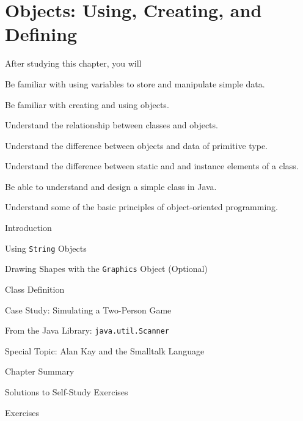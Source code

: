 
\setcounter{SSTUDYcount}{1}
\setcounter{chapter}{1}
\chapter{Objects: Using, Creating, and Defining}
\label{chapter-objects}


\CObegin
{}
\label{objectives}
\noindent After studying this chapter, you will
\begin{COBL}
\item Be familiar with using variables to store and manipulate simple data.
\item Be familiar with creating and using objects.
\item Understand the relationship between classes and objects.
\item Understand the difference between objects and data of primitive type.
\item Understand the difference between static and and instance 
elements of a class.
\item Be able to understand and design a simple class in Java.
\item Understand some of the basic principles of object-oriented programming.

\end{COBL}

\label{outline}
\begin{COL}
\item Introduction
\item Using {\tt String} Objects
\item Drawing Shapes with the {\tt Graphics} Object (Optional)
\item Class Definition
\item Case Study: Simulating a Two-Person Game
\item {From the Java Library: {\tt java.util.Scanner}}
\item[]{{\color{cyan}Special Topic:} Alan Kay and the Smalltalk Language}
\par\small\item[] Chapter Summary
\par\small\item[] Solutions to Self-Study Exercises
\par\small\item[] Exercises
\end{COL}
\COend

